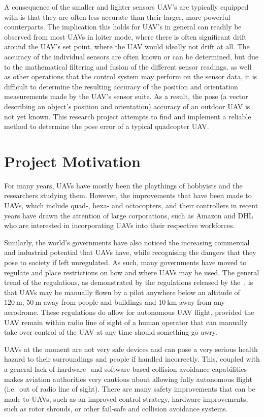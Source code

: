 A consequence of the smaller and lighter sensors UAV's are typically equipped with is that they are often less accurate than their larger, more powerful counterparts. The implication this holds for UAV's in general can readily be observed from most UAVs in loiter mode, where there is often significant drift around the UAV's set point, where the UAV would ideally not drift at all. The accuracy of the individual sensors are often known or can be determined, but due to the mathematical filtering and fusion of the different sensor readings, as well as other operations that the control system may perform on the sensor data, it is difficult to determine the resulting accuracy of the position and orientation measurements made by the UAV's sensor suite. As a result, the pose (a vector describing an object's position and orientation) accuracy of an outdoor UAV is not yet known. This research project attempts to find and implement a reliable method to determine the pose error of a typical quadcopter UAV.\@  

\section{Project Motivation}

For many years, UAVs have mostly been the playthings of hobbyists and the researchers studying them. However, the improvements that have been made to UAVs, which include quad-, hexa- and octocopters, and their controllers in recent years have drawn the attention of large corporations, such as Amazon and DHL who are interested in incorporating UAVs into their respective workforces. 

Similarly, the world's governments have also noticed the increasing commercial and industrial potential that UAVs have, while recognising the dangers that they pose to society if left unregulated. As such, many governments have moved to regulate and place restrictions on how and where UAVs may be used. The general trend of the regulations, as demonstrated by the regulations released by the~\cite{sacaa-drone-regs}, is that UAVs may be manually flown by a pilot anywhere below an altitude of $\SI{120}{\m}$, $\SI{50}{\m}$ away from people and buildings and $\SI{10}{\km}$ away from any aerodrome. These regulations do allow for autonomous UAV flight, provided the UAV remain within radio line of sight of a human operator that can manually take over control of the UAV at any time should something go awry. 

UAVs at the moment are not very safe devices and can pose a very serious health hazard to their surroundings and people if handled incorrectly. This, coupled with a general lack of hardware- and software-based collision avoidance capabilities makes aviation authorities very cautious about allowing fully autonomous flight (i.e.\ out of radio line of sight). There are many safety improvements that can be made to UAVs, such as an improved control strategy, hardware improvements, such as rotor shrouds, or other fail-safe and collision avoidance systems. 

